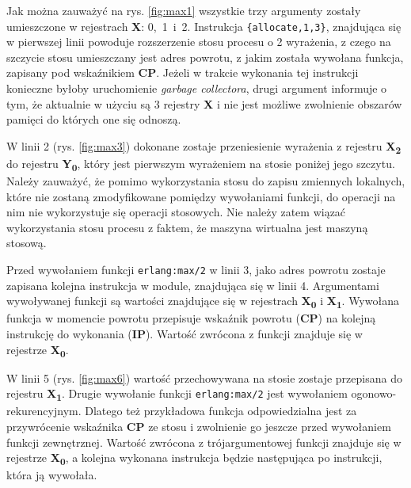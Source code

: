 Jak można zauważyć na rys. \ref{fig:max1} wszystkie trzy argumenty zostały umieszczone w rejestrach \textbf{X}: 0,~1~i~2. Instrukcja \texttt{\{allocate,1,3\}}, znajdująca się w pierwszej linii powoduje rozszerzenie stosu procesu o 2 wyrażenia, z czego na szczycie stosu umieszczany jest adres powrotu, z jakim została wywołana funkcja, zapisany pod wskaźnikiem \textbf{CP}. Jeżeli w trakcie wykonania tej instrukcji konieczne byłoby uruchomienie \emph{garbage collectora}, drugi argument informuje o tym, że aktualnie w użyciu są 3 rejestry \textbf{X} i nie jest możliwe zwolnienie obszarów pamięci do których one się odnoszą.

W linii 2 (rys. \ref{fig:max3}) dokonane zostaje przeniesienie wyrażenia z rejestru \textbf{X\textsubscript{2}} do rejestru \textbf{Y\textsubscript{0}}, który jest pierwszym wyrażeniem na stosie poniżej jego szczytu.
Należy zauważyć, że pomimo wykorzystania stosu do zapisu zmiennych lokalnych, które nie zostaną zmodyfikowane pomiędzy wywołaniami funkcji, do operacji na nim nie wykorzystuje się operacji stosowych.
Nie należy zatem wiązać wykorzystania stosu procesu z faktem, że maszyna wirtualna jest maszyną stosową.

Przed wywołaniem funkcji \texttt{erlang:max/2} w linii 3, jako adres powrotu zostaje zapisana kolejna instrukcja w module, znajdująca się w linii 4. Argumentami wywoływanej funkcji są wartości znajdujące się w rejestrach \textbf{X\textsubscript{0}} i \textbf{X\textsubscript{1}}. Wywołana funkcja w momencie powrotu przepisuje wskaźnik powrotu (\textbf{CP}) na kolejną instrukcję do wykonania (\textbf{IP}). Wartość zwrócona z funkcji znajduje się w rejestrze \textbf{X\textsubscript{0}}. 

W linii 5 (rys. \ref{fig:max6}) wartość przechowywana na stosie zostaje przepisana do rejestru \textbf{X\textsubscript{1}}.
Drugie wywołanie funkcji \texttt{erlang:max/2} jest wywołaniem ogonowo-rekurencyjnym.
Dlatego też przykładowa funkcja odpowiedzialna jest za przywrócenie wskaźnika \textbf{CP} ze stosu i zwolnienie go jeszcze przed wywołaniem funkcji zewnętrznej. 
Wartość zwrócona z trójargumentowej funkcji znajduje się w rejestrze \textbf{X\textsubscript{0}}, a kolejna wykonana instrukcja będzie następująca po instrukcji, która ją wywołała.

